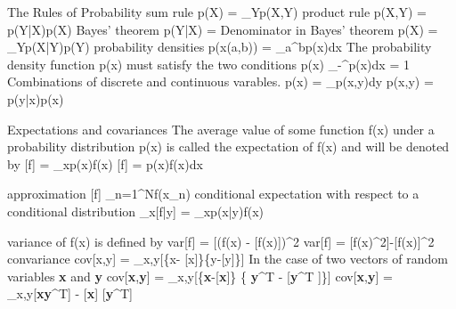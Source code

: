 The Rules of Probability
sum rule
                                  p(X) = \sum_{Y}p(X,Y)
product rule
                                  p(X,Y) = p(Y|X)p(X)
Bayes' theorem
                                  p(Y|X) = 
Denominator in Bayes' theorem
                                  p(X) = \sum_Y{p(X|Y)p(Y)}
probability densities
                                  p(x\in (a,b)) = \int_{a}^{b}p(x)dx
The probability density function p(x) must satisfy the two conditions
                                  p(x) 
                                  \int_{-\infty}^{\infty}p(x)dx = 1
Combinations of discrete and continuous varables.
                                  p(x) = \int_p(x,y)dy
                                  p(x,y) = p(y|x)p(x)
                                  
Expectations and covariances
The average value of some function f(x) under a probability distribution p(x) is called the expectation of f(x) and
will be denoted by 
                                  [f] = \sum_{x}p(x)f(x)
                                  [f] = \int p(x)f(x)dx
                                  
approximation
                                  [f] \simeq {}\sum_{n=1}^{N}{f(x_n)}
conditional expectation with respect to a conditional distribution                                
                                  _x[f|y] = \sum_{x}p(x|y)f(x)

variance of f(x) is defined by
                                  var[f] = [(f(x) - [f(x)])^2
                                  var[f] = [f(x)^2]-[f(x)]^2
convariance 
                                  cov[x,y] = _{x,y}[\{x- [x]\}\{y-[y]\}]
In the case of two vectors of random variables \textbf{x} and \textbf{y}
cov[\textbf{x},\textbf{y}] = _{x,y}[\{\textbf{x}-[\textbf{x}]\} \{ \textbf{y}^T - [\textbf{y}^T ]\}]
cov[\textbf{x},\textbf{y}] = _{x,y}[\textbf{x}\textbf{y}^T] - [\textbf{x}] [\textbf{y}^T]


